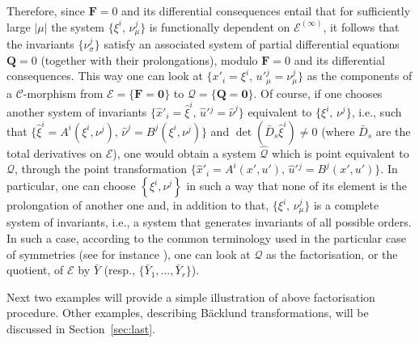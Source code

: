 \documentclass[12pt,english]{elsarticle}
\theoremstyle{plain}
\theoremstyle{plain}
\theoremstyle{remark}
\theoremstyle{plain}
\theoremstyle{definition}
\theoremstyle{definition}
\begin{document}
Therefore, since $\mathbf{F}=0$ and its differential consequences entail
that for sufficiently large $|\mu |$ the system
$\{\xi ^{i},\,\nu _{\mu}^{j}\}$ is functionally dependent on
$\mathcal{E}^{(\infty )}$, it follows that the invariants
$\{\nu{}_{\sigma}^{j}\}$ satisfy an associated system of partial differential
equations $\mathbf{Q}=0$ (together with their prolongations), modulo
$\mathbf{F}=0$ and its differential consequences. This way one can look
at $\{x'_{i}=\xi ^{i},\,u'{}_{\mu}^{j}=\nu _{\mu}^{j}\}$ as the components
of a $\mathcal{C}$-morphism from
$\mathcal{E}=\{\mathbf{F}=\mathbf{0}\}$ to
$\mathcal{Q}=\{\mathbf{Q}=\mathbf{0}\}$. Of course, if one chooses another
system of invariants
$\{\hat{x}'_{i}=\hat{\xi}^{i},\,\hat{u}'{}^{j}=\hat{\nu}^{j}\}$ equivalent
to $\{\xi ^{i},\,\nu ^{j}\}$, i.e., such that
$\{\hat{\xi}^{i}=A^{i}(\xi ^{i},\nu ^{j}),\,\hat{\nu}^{j}=B^{j}(\xi ^{i},
\nu ^{j})\}$ and
$\det \left (\bar{D}_{s}\hat{\xi}^{i}\right )\neq 0$ (where
$\bar{D}_{s}$ are the total derivatives on $\mathcal{E}$), one would obtain
a system $\mathcal{\hat{Q}}$ which is point equivalent to
$\mathcal{Q}$, through the point transformation
$\{\hat{x}'_{i}=A^{i}(x',u'),\,\hat{u}'{}^{j}=B^{j}(x',u')\}$. In particular,
one can choose $\left \{ \xi ^{i},\nu ^{j}\right \} $ in such a way that
none of its element is the prolongation of another one and, in addition
to that, $\{\xi ^{i},\,\nu _{\mu}^{j}\}$ is a complete system of invariants,
i.e., a system that generates invariants of all possible orders. In such
a case, according to the common terminology used in the particular case
of symmetries (see for instance \cite{KLV,Sokolov,Svino-Sok}), one can
look at $\mathcal{Q}$ as the factorisation, or the quotient, of
$\mathcal{E}$ by $\bar{Y}$ (resp., $\{\bar{Y}_{1},...,\bar{Y}_{r}\}$).

Next two examples will provide a simple illustration of above factorisation
procedure. Other examples, describing B\"{a}cklund transformations, will
be discussed in Section~\ref{sec:last}.
\end{document}
